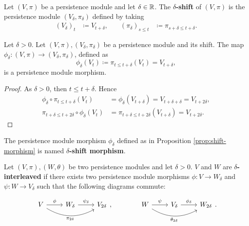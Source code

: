 \begin{definition}
    Let $ (V, \pi) $ be a persistence module and let $ \delta \in \mathbb R $. The {\bf $\delta$-shift} of $ (V, \pi) $ is the persistence module $ (V_\delta, \pi_\delta) $ defined by taking
    \begin{align}
        (V_\delta)_t &\coloneq V_{t+\delta}, \quad & (\pi_\delta)_{s\leq t} &\coloneq \pi_{s+\delta \leq t+\delta}.
    \end{align}
\end{definition}

\begin{proposition} \label{prop:shift-morphism}
    Let $ \delta > 0 $. Let $(V, \pi), (V_\delta, \pi_\delta) $ be a persistence module and its shift. The map $ \phi_\delta \colon (V, \pi) \to (V_\delta, \pi_\delta) $, defined as
    $$
        \phi_\delta (V_t) \coloneq \pi_{t \leq t + \delta}(V_t) = V_{t+\delta},
    $$
    is a persistence module morphism.
\end{proposition}
\begin{proof}
    As $ \delta > 0 $, then $ t \leq t+\delta $. Hence
    \begin{align}
        \phi_\delta \circ \pi_{t \leq t+\delta} (V_t) &= \phi_\delta (V_{t+\delta}) = V_{t+\delta+\delta} = V_{t+2 \delta}, \\
        \pi_{t+\delta \leq t+2\delta} \circ \phi_\delta (V_t) &= \pi_{t+\delta \leq t+2\delta}(V_{t+\delta}) = V_{t+2 \delta}.
    \end{align}
\end{proof}

\begin{definition}
    The persistence module morphism $ \phi_\delta $ defined as in Proposition \ref{prop:shift-morphism} is named {\bf $\delta$-shift morphism}.
\end{definition}

\begin{definition}
    Let $ (V, \pi), (W, \theta) $ be two persistence modules and let $ \delta > 0 $. $ V $ and $ W $ are {\bf $\delta$-interleaved } if there exists two persistence module morphisms $ \phi \colon V \to W_\delta $ and $ \psi \colon W \to V_\delta $ such that the following diagrams commute:
\end{definition}
$$
\begin{array}{ccc}
\begin{tikzcd}
    V \arrow[r, "\phi"] \arrow[rr, "\pi_{2\delta}"', bend right] & W_\delta \arrow[r, "\psi_\delta"] & V_{2\delta}
\end{tikzcd},
&
\quad \quad
&
\begin{tikzcd}
    W \arrow[r, "\psi"] \arrow[rr, "\theta_{2\delta}"', bend right] & V_\delta \arrow[r, "\phi_\delta"] & W_{2\delta}
\end{tikzcd}.
\end{array}
$$

